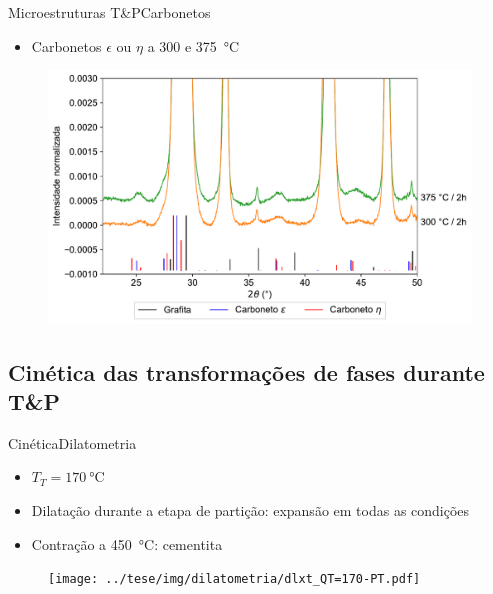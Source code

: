 \begin{frame}{Microestruturas T\&P}{Carbonetos}
  \begin{itemize}
    \item Carbonetos $\epsilon$ ou $\eta$ a 300 e \SI{375}{\degreeCelsius}
  \end{itemize}  

  \begin{figure}
    \includegraphics[width=.93\textwidth]{img/selected_diffractograms_eta.pdf}
  \end{figure}
\end{frame}


\subsection{Cinética das transformações de fases durante T\&P}

\begin{frame}{Cinética}{Dilatometria}
  \begin{itemize}
    \item $T_T = \SI{170}{\degreeCelsius}$
    \item Dilatação durante a etapa de partição: expansão em todas as condições
    \item Contração a \SI{450}{\degreeCelsius}: cementita
  \end{itemize}

  \begin{figure}
    \texttt{[image: ../tese/img/dilatometria/dlxt\_QT=170-PT.pdf]}
  \end{figure}
\end{frame}

